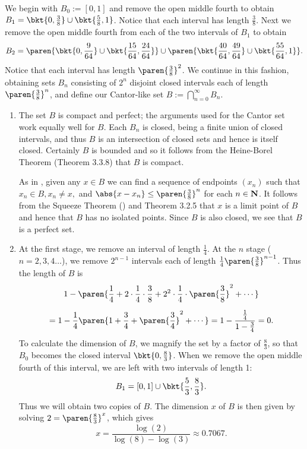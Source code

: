 \documentclass{lew98_solutions}
\begin{document}
\begin{solution}
    We begin with \( B_0 := [0, 1] \) and remove the open middle fourth to obtain \( B_1 = \bkt{ 0, \tfrac{3}{8} } \cup \bkt{ \tfrac{5}{8}, 1 } \). Notice that each interval has length \( \tfrac{3}{8} \). Next we remove the open middle fourth from each of the two intervals of \( B_1 \) to obtain
    \[
        B_2 = \paren{ \bkt{ 0, \frac{9}{64} } \cup \bkt{ \frac{15}{64}, \frac{24}{64} } } \cup \paren{ \bkt{ \frac{40}{64}, \frac{49}{64} } \cup \bkt{ \frac{55}{64}, 1 } }.
    \]
    Notice that each interval has length \( \paren{ \tfrac{3}{8} }^2 \). We continue in this fashion, obtaining sets \( B_n \) consisting of \( 2^n \) disjoint closed intervals each of length \( \paren{ \tfrac{3}{8} }^n \), and define our Cantor-like set \( B := \bigcap_{n=0}^{\infty} B_n \).
    \begin{enumerate}
        \item The set \( B \) is compact and perfect; the arguments used for the Cantor set work equally well for \( B \). Each \( B_n \) is closed, being a finite union of closed intervals, and thus \( B \) is an intersection of closed sets and hence is itself closed. Certainly \( B \) is bounded and so it follows from the Heine-Borel Theorem (Theorem 3.3.8) that \( B \) is compact.
        
        As in , given any \( x \in B \) we can find a sequence of endpoints \( (x_n) \) such that \( x_n \in B, x_n \neq x, \) and \( \abs{x - x_n} \leq \paren{ \tfrac{3}{8} }^n \) for each \( n \in \mathbf{N} \). It follows from the Squeeze Theorem () and Theorem 3.2.5 that \( x \) is a limit point of \( B \) and hence that \( B \) has no isolated points. Since \( B \) is also closed, we see that \( B \) is a perfect set.

        \item At the first stage, we remove an interval of length \( \tfrac{1}{4} \). At the \( n \) stage (\( n = 2, 3, 4 \ldots \)), we remove \( 2^{n-1} \) intervals each of length \( \tfrac{1}{4} \paren{ \tfrac{3}{8} }^{n-1} \). Thus the length of \( B \) is
        \begin{multline*}
            1 - \paren{ \frac{1}{4} + 2 \cdot \frac{1}{4} \cdot \frac{3}{8} + 2^2 \cdot \frac{1}{4} \cdot \paren{ \frac{3}{8} }^2 + \cdots } \\[2mm]
            = 1 - \frac{1}{4} \paren{ 1 + \frac{3}{4} + \paren{ \frac{3}{4} }^2 + \cdots } = 1 - \frac{\tfrac{1}{4}}{1 - \tfrac{3}{4}} = 0.
        \end{multline*}
        To calculate the dimension of \( B \), we magnify the set by a factor of \( \tfrac{8}{3} \), so that \( B_0 \) becomes the closed interval \( \bkt{ 0, \tfrac{8}{3} } \). When we remove the open middle fourth of this interval, we are left with two intervals of length 1:
        \[
            B_1 = [0, 1] \cup \bkt{ \frac{5}{3}, \frac{8}{3} }.
        \]
        Thus we will obtain two copies of \( B \). The dimension \( x \) of \( B \) is then given by solving \( 2 = \paren{ \tfrac{8}{3} }^x \), which gives
        \[
            x = \frac{\log(2)}{\log(8) - \log(3)} \approx 0.7067.
        \]
    \end{enumerate}
\end{solution}
\end{document}
